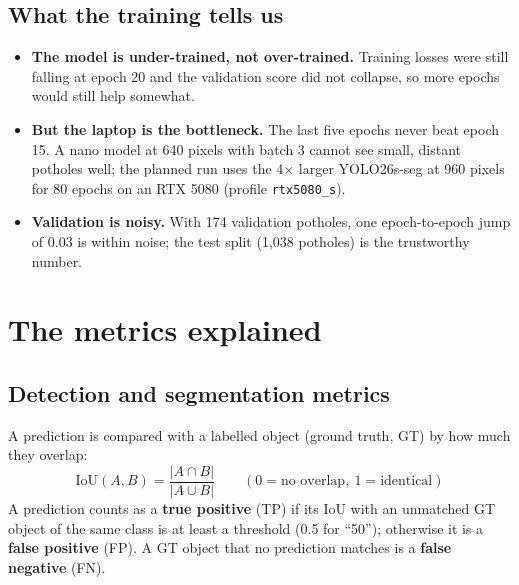 \documentclass[11pt,a4paper]{article}
\newcommand{\code}[1]{\texttt{\small #1}}
\begin{document}
\subsection{What the training tells us}
\begin{itemize}
  \item \textbf{The model is under-trained, not over-trained.} Training losses were still falling at epoch 20 and the
        validation score did not collapse, so more epochs would still help somewhat.
  \item \textbf{But the laptop is the bottleneck.} The last five epochs never beat epoch 15. A nano model at 640 pixels
        with batch 3 cannot see small, distant potholes well; the planned run uses the 4$\times$ larger YOLO26s-seg at
        960 pixels for 80 epochs on an RTX 5080 (profile \code{rtx5080\_s}).
  \item \textbf{Validation is noisy.} With 174 validation potholes, one epoch-to-epoch jump of 0.03 is within noise;
        the test split (1,038 potholes) is the trustworthy number.
\end{itemize}

\section{The metrics explained}\label{sec:metrics}

\subsection{Detection and segmentation metrics}
A prediction is compared with a labelled object (ground truth, GT) by how much they overlap:
\[ \text{IoU}(A,B) = \frac{|A\cap B|}{|A\cup B|} \qquad (0 = \text{no overlap},\ 1 = \text{identical}) \]
A prediction counts as a \textbf{true positive} (TP) if its IoU with an unmatched GT object of the same class is at
least a threshold (0.5 for ``50''); otherwise it is a \textbf{false positive} (FP). A GT object that no prediction
matches is a \textbf{false negative} (FN).
\end{document}

